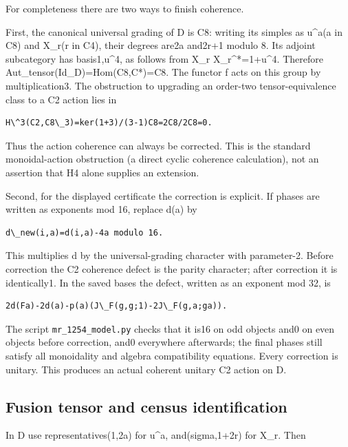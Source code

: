For completeness there are two ways to finish coherence.

First, the canonical universal grading of D is C8: writing its simples
as u\^{}a(a in C8) and X\_r(r in C4), their degrees are2a and2r+1 modulo
8. Its adjoint subcategory has basis1,u\^{}4, as follows from X\_r
X\_r\^{}*=1+u\^{}4. Therefore Aut\_tensor(Id\_D)=Hom(C8,C*)=C8. The
functor f acts on this group by multiplication3. The obstruction to
upgrading an order-two tensor-equivalence class to a C2 action lies in

\begin{verbatim}
H\^3(C2,C8\_3)=ker(1+3)/(3-1)C8=2C8/2C8=0.
\end{verbatim}

Thus the action coherence can always be corrected. This is the standard
monoidal-action obstruction (a direct cyclic coherence calculation), not
an assertion that H4 alone supplies an extension.

Second, for the displayed certificate the correction is explicit. If
phases are written as exponents mod 16, replace d(a) by

\begin{verbatim}
d\_new(i,a)=d(i,a)-4a modulo 16.
\end{verbatim}

This multiplies d by the universal-grading character with parameter-2.
Before correction the C2 coherence defect is the parity character; after
correction it is identically1. In the saved bases the defect, written as
an exponent mod 32, is

\begin{verbatim}
2d(Fa)-2d(a)-p(a)(J\_F(g,g;1)-2J\_F(g,a;ga)).
\end{verbatim}

The script
\texttt{mr\_\allowbreak{}1254\_\allowbreak{}model.\allowbreak{}py}
checks that it is16 on odd objects and0 on even objects before
correction, and0 everywhere afterwards; the final phases still satisfy
all monoidality and algebra compatibility equations. Every correction is
unitary. This produces an actual coherent unitary C2 action on D.

\hypertarget{fusion-tensor-and-census-identification}{%
\subsection{Fusion tensor and census
identification}\label{fusion-tensor-and-census-identification}}

In D use representatives(1,2a) for u\^{}a, and(sigma,1+2r) for X\_r.
Then

